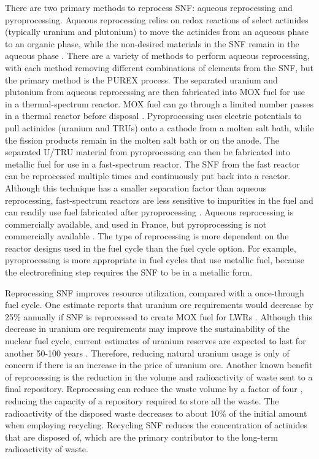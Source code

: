 There are two primary methods to reprocess \gls{SNF}: aqueous reprocessing 
and pyroprocessing. Aqueous reprocessing relies on redox reactions of 
select actinides (typically uranium and plutonium) to move the 
actinides from an aqueous phase to an organic phase, while the non-desired 
materials in the \gls{SNF} remain in the aqueous phase \cite{rodriguez-penalonga_review_2017}. 
There 
are a variety of methods to perform aqueous reprocessing, with each method 
removing different combinations of elements from the \gls{SNF}, but the primary 
method is the PUREX process. The separated uranium and plutonium from 
aqueous reprocessing are then fabricated into \gls{MOX} fuel for use in 
a thermal-spectrum reactor. \gls{MOX} fuel can go through a limited number 
passes in a thermal reactor before disposal \cite{rodriguez-penalonga_review_2017}.
Pyroprocessing uses electric potentials to 
pull actinides (uranium and 
\glspl{TRU}) onto a cathode from a molten salt bath, while the fission products
remain in the molten salt bath or on the anode. The 
separated U/\gls{TRU} material from pyroprocessing can then be fabricated 
into metallic fuel for use in a fast-spectrum reactor. 
The \gls{SNF} from 
the fast reactor can be reprocessed multiple times and continuously put back 
into a reactor. Although this technique 
has a smaller separation factor than aqueous reprocessing, fast-spectrum 
reactors are less sensitive to impurities in the fuel and can readily use 
fuel fabricated after pyroprocessing \cite{rodriguez-penalonga_review_2017}.
Aqueous reprocessing is commercially available, and used in 
France, but pyroprocessing is not commercially available 
\cite{rodriguez-penalonga_review_2017,noauthor_status_2021}. The
type of reprocessing is more dependent on the reactor designs 
used in the fuel cycle than the fuel cycle option. For example, 
pyroprocessing is more appropriate in fuel cycles that use metallic 
fuel, because the electrorefining step requires the \gls{SNF} to 
be in a metallic form. 

Reprocessing \gls{SNF} improves resource utilization, compared 
with a once-through fuel cycle. One estimate reports that uranium ore
requirements would decrease by 25\% annually if \gls{SNF} is reprocessed 
to create \gls{MOX} fuel for \glspl{LWR} \cite{widder_benefits_2010}. 
Although this decrease in uranium ore requirements may improve the 
sustainability of the nuclear fuel cycle, current estimates of uranium 
reserves are expected to last for another 50-100 years 
\cite{widder_benefits_2010}. Therefore, reducing natural uranium usage  
is only of concern 
if there is an increase in the price of uranium ore. Another known benefit 
of reprocessing is the reduction in the volume and radioactivity of 
waste sent to a final repository. Reprocessing can reduce the waste 
volume by a factor of four \cite{widder_benefits_2010}, 
reducing the capacity of a repository required to store all the 
waste.
The radioactivity of the disposed waste decreases to about 10\% of the 
initial amount \cite{rodriguez-penalonga_review_2017} when employing 
recycling. Recycling \gls{SNF} reduces the concentration of actinides 
that are disposed of, which are the primary contributor to the long-term 
radioactivity of waste. 

